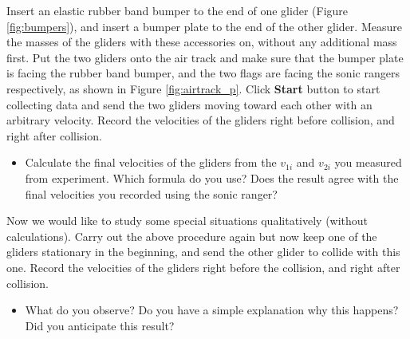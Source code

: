 Insert an elastic rubber band bumper to the end of one glider (Figure \ref{fig:bumpers}), and insert a bumper plate to the end of the other glider. Measure the masses of the gliders with these accessories on, without any additional mass first. Put the two gliders onto the air track and make sure that the bumper plate is facing the rubber band bumper, and the two flags are facing the sonic rangers respectively, as shown in Figure \ref{fig:airtrack_p}. Click \textbf{Start} button to start collecting data and send the two gliders moving toward each other with an arbitrary velocity. Record the velocities of the gliders right before collision, and right after collision. 
\begin{itemize}
    \item Calculate the final velocities of the gliders from the $v_{1i}$ and $v_{2i}$ you measured from experiment. Which formula do you use? Does the result agree with the final velocities you recorded using the sonic ranger? 
\end{itemize}

Now we would like to study some special situations qualitatively (without calculations). Carry out the above procedure again but now keep one of the gliders stationary in the beginning, and send the other glider to collide with this one. Record the velocities of the gliders right before the collision, and right after collision.
\begin{itemize}
    \item What do you observe? Do you have a simple explanation why this happens? Did you anticipate this result?
\end{itemize}

